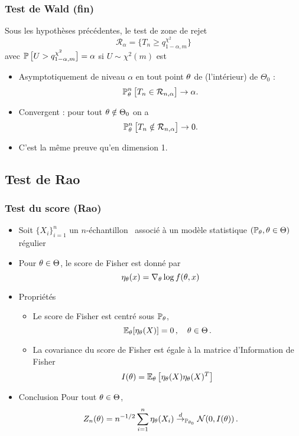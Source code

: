 \begin{frame}
\frametitle{Test de Wald (fin)}
\begin{prop}
Sous les hypothèses précédentes, le test de zone de rejet
$${\mathcal R}_\alpha  = \big\{T_n \geq q_{1-\alpha, m}^{\chi^2}\big\}$$
avec $\operatorname{{\mathbb P}}\big[U > q_{1-\alpha, m}^{\chi^2}\big]=\alpha$ si $U \sim \chi^2(m)$ est
\begin{itemize}
\item \alert{Asymptotiquement de niveau $\alpha$} en tout point $\theta$ de (l'intérieur) de $\Theta_0$ :
$$\operatorname{{\mathbb P}}_\theta^n\big[T_n \in {\mathcal R}_{n,\alpha}\big]\rightarrow \alpha.$$
\item \alert{Convergent} : pour tout $\theta \notin \Theta_0$ on a
$$\operatorname{{\mathbb P}}_\theta^n\big[T_n \notin {\mathcal R}_{n,\alpha}\big]\rightarrow 0.$$
\end{itemize}
\end{prop}
\begin{itemize}
\item C'est la  même preuve qu'en dimension 1.
\end{itemize}
\end{frame}



\subsection{Test de Rao}


\begin{frame}
\frametitle{Test du score (Rao)}
\begin{itemize}
\item Soit $\{X_i\}_{i=1}^n$ un $n$-échantillon \iid\ associé à un modèle statistique $(\operatorname{{\mathbb P}}_\theta, \theta \in \Theta)$  \alert{régulier}
\item Pour $\theta \in \Theta$, le \alert{score de Fisher} est donné par
\[
\eta_{\theta}(x)= \nabla_{\theta} \log f(\theta,x)
\]
\item \alert{Propriétés}
\begin{itemize}
\item Le score de Fisher est centré sous $\operatorname{{\mathbb P}}_{\theta}$,
$$
\operatorname{{\mathbb E}}_{\theta}[\eta_{\theta}(X)]= 0 \,, \quad \theta \in \Theta \,.
$$
\item La covariance du score de Fisher est égale à la \alert{matrice d'Information de Fisher}
$$
I(\theta)= \operatorname{{\mathbb E}}_{\theta} \left[ \eta_{\theta}(X) \eta_{\theta}(X)^T \right]
$$
\end{itemize}
\item \alert{Conclusion} Pour tout $\theta \in \Theta$,
$$
Z_n(\theta) = n^{-1/2} \sum_{i=1}^n \eta_\theta(X_i) \stackrel{d}{\rightarrow}_{\operatorname{{\mathbb P}}_{\theta_0}} \mathcal{N}(0, I(\theta)) \,.
$$
\end{itemize}
\end{frame}

